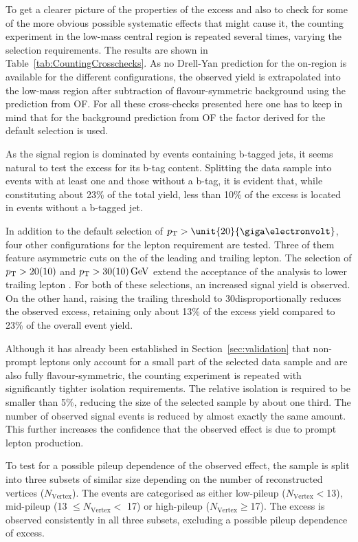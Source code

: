 To get a clearer picture of the properties of the excess and also to check for some of the more obvious possible systematic effects that might cause it, the counting experiment in the low-mass central region is repeated several times, varying the selection requirements. The results are shown in Table~\ref{tab:CountingCrosschecks}. As no Drell-Yan prediction for the on-\Z region is available for the different configurations, the observed yield is extrapolated into the low-mass region after subtraction of flavour-symmetric background using the prediction from OF. For all these cross-checks presented here one has to keep in mind that for the background prediction from OF the \Rsfof factor derived for the default selection is used.

As the signal region is dominated by events containing b-tagged jets, it seems natural to test the excess for its b-tag content. Splitting the data sample into events with at least one and those without a b-tag, it is evident that, while constituting about 23\% of the total yield, less than 10\% of the excess is located in events without a b-tagged jet. 

In addition to the default selection of $\pt > \unit{20}{\giga\electronvolt}$, four other configurations for the lepton \pt requirement are tested. Three of them feature asymmetric cuts on the \pt of the leading and trailing lepton. The selection of $p_{\mathrm{T}} > 20(10)$ and $ p_{\mathrm{T}} > 30(10)\,\mathrm{Ge\hspace{-.08em}V}$ extend the acceptance of the analysis to lower trailing lepton \pt. For both of these selections, an increased signal yield is observed. On the other hand, raising the trailing \pt threshold to 30\GeV disproportionally reduces the observed excess, retaining only about 13\% of the excess yield compared to 23\% of the overall event yield. 

Although it has already been established in Section~\ref{sec:validation} that non-prompt leptons only account for a small part of the selected data sample and are also fully flavour-symmetric, the counting experiment is repeated with significantly tighter isolation requirements. The relative isolation is required to be smaller than 5\%, reducing the size of the selected sample by about one third. The number of observed signal events is reduced by almost exactly the same amount. This further increases the confidence that the observed effect is due to prompt lepton production.

To test for a possible pileup dependence of the observed effect, the sample is split into three subsets of similar size depending on the number of reconstructed vertices ($N_{\mathrm{Vertex}}$). The events are categorised as either low-pileup ($N_{\mathrm{Vertex}} < $13), mid-pileup (13 $\leq N_{\mathrm{Vertex}} <$ 17) or high-pileup ($N_{\mathrm{Vertex}} \geq $17). The excess is observed consistently in all three subsets, excluding a possible pileup dependence of excess. 

